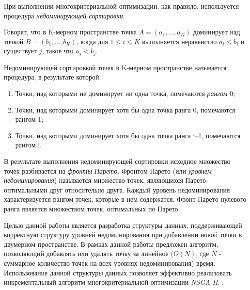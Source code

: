 При выполнении многокритериальной оптимизации, как правило, используется процедура 
\textit{недоминирующей сортировки}. \cite{deb_nsga2}
	
Говорят,  что  в K-мерном  пространстве  точка $A = (a_1, ..., a_K)$ доминирует  над  
точкой $B = (b_1,  ..., b_K)$, когда для $1 \le i \le K $ выполняется неравенство 
$a_i \le b_i $ и существует $j$, такое что $a_j < b_j $.

Недоминирующей сортировкой точек в K-мерном пространстве называется процедура, в результате которой:
\begin{enumerate}
\item Точки, над которыми не доминирует ни одна точка, помечаются \textit{рангом} 0;
\item Точки, над которыми доминирует хотя бы одна точка ранга 0, помечаются рангом 1;
\item Точки, над которыми доминирует хотя бы одна точка ранга i–1, помечаются рангом i.
\end{enumerate}

В результате выполнения недоминирующей сортировки исходное множество точек разбивается на 
\textit{фронты Парето}. Фронтом Парето (или \textit{уровнем недоминирования}) называется 
множество точек, являющихся Парето-оптимальными друг относительно друга. Каждый уровень
недоминирования характеризуется рангом точек, которые в нем содержатся.
Фронт Парето нулевого ранга является множеством точек, оптимальных по Парето.

Целью данной работы является разработка структуры данных, поддерживающей корректную 
структуру уровней недоминирования при добавлении новой точки в двумерном пространстве.
В рамках данной работы предложен алгоритм, позволяющий добавлять или удалять точку за 
линейное ($O(N)$, где $N$ - суммарное количество точек на всех уровнях недоминирования)
время. Использование данной структуры данных позволяет эффективно реализовать 
инкрементальный алгоритм многокритериальной оптимизации \textit{NSGA-II}. 
\cite{max_me_ss_nsga2}.
